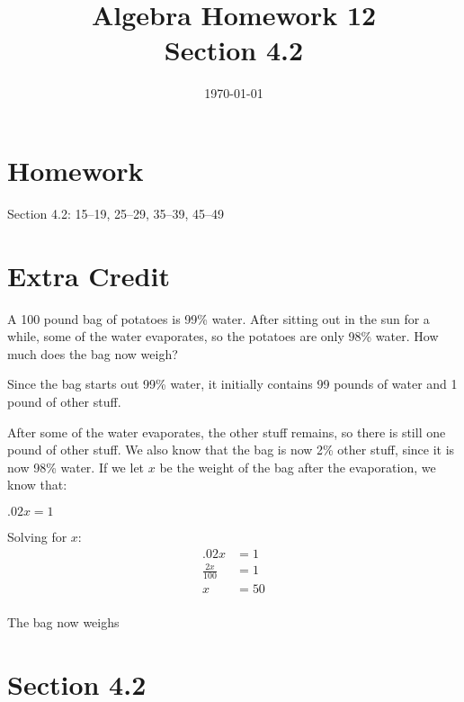\documentclass[letterpaper, landscape]{exam}
\title{Algebra Homework 12 \\ Section 4.2}
\author{}
\date{\today}
\begin{document}
  \maketitle

  \section{Homework}

  Section 4.2: 15--19, 25--29, 35--39, 45--49

  \section{Extra Credit}

  A 100 pound bag of potatoes is 99\% water.  After sitting out in the sun for
  a while, some of the water evaporates, so the potatoes are only 98\% water.
  How much does the bag now weigh?

  \begin{solution}
    Since the bag starts out 99\% water, it initially contains 99 pounds of water and 1 pound of other stuff.  

    After some of the water evaporates, the other stuff remains, so there is still one pound of other stuff.  We also know
    that the bag is now 2\% other stuff, since it is now 98\% water.  If we let $x$ be the weight of the bag after the
    evaporation, we know that:

    \( .02x = 1 \)

    Solving for $x$:
    \begin{align*}
      .02x           & = 1 \\
      \frac{2x}{100} & = 1 \\
      x              & = 50 \\
    \end{align*}

    The bag now weighs 

  \end{solution}

  \ifprintanswers{}
    \section{Section 4.2} %
    
\end{document}
